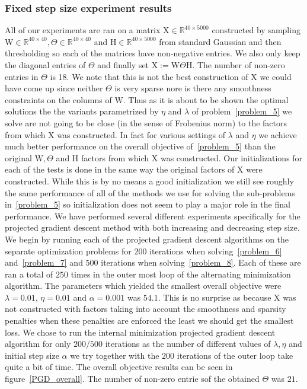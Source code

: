 \documentclass{article}
\newcommand{\0}{\mathrm{0}}
\newcommand{\1}{\mathrm{1}}
\renewcommand{\H}{\mathrm{H}}
\newcommand{\W}{\mathrm{W}}
\newcommand{\X}{\mathrm{X}}
\begin{document}
\subsubsection{Fixed step size experiment results}
%
All of our experiments are ran on a matrix $\X \in \mathbb{R}^{40\times 5000}$ constructed by sampling $\W \in \mathbb{R}^{40\times 40}, \Theta \in \mathbb{R}^{40\times 40}$ and $\H \in \mathbb{R}^{40\times 5000}$ from standard Gaussian and then thresholding so each of the matrices have non-negative entries. We also only keep the diagonal entries of $\Theta$ and finally set $\X := \W\Theta\H$. The number of non-zero entries in $\Theta$ is 18. We note that this is not the best construction of $\X$ we could have come up since neither $\Theta$ is very sparse nore is there any smoothness constraints on the columns of $\W$. Thus as it is about to be shown the optimal solutions the the variants parametrized by $\eta$ and $\lambda$ of problem~\ref{problem_5} we solve are not going to be close (in the sense of Frobenius norm) to the factors from which $\X$ was constructed. In fact for various settings of $\lambda$ and $\eta$ we achieve much better performance on the overall objective of~\ref{problem_5} than the original $\W,\Theta$ and $\H$ factors from which $\X$ was constructed. Our initializations for each of the tests is done in the same way the original factors of $\X$ were constructed. While this is by no means a good initialization we still see roughly the same performance of all of the methods we use for solving the sub-problems in~\ref{problem_5} so initialization does not seem to play a major role in the final performance. We have performed several different experiments specifically for the projected gradient descent method with both increasing and decreasing step size. We begin by running each of the projected gradient descent algorithms on the separate optimization problems for $200$ iterations when solving~\ref{problem_6} and~\ref{problem_7} and $500$ iterations when solving~\ref{problem_8}. Each of these are ran a total of $250$ times in the outer most loop of the alternating minimization algorithm. The parameters which yielded the smallest overall objective were $\lambda = 0.01$, $\eta = 0.01$ and $\alpha = 0.001$ was $54.1$. This is no surprise as because $\X$ was not constructed with factors taking into account the smoothness and sparsity penalties when these penalties are enforced the least we should get the smallest loss. We chose to run the internal minimization projected gradient descent algorithm for only $200/500$ iterations as the number of different values of $\lambda,\eta$ and initial step size $\alpha$ we try together with the $200$ iterations of the outer loop take quite a bit of time. The overall objective results can be seen in figure~\ref{PGD_overall}. The number of non-zero entrie sof the obtained $\Theta$ was $21$. 
\end{document}
